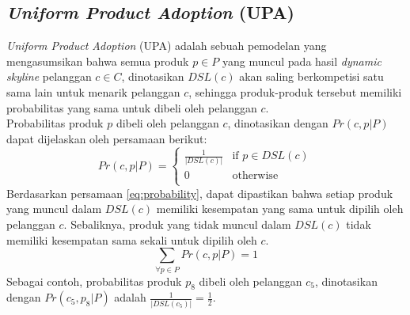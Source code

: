 \subsection{\textit{Uniform Product Adoption} (UPA)}
\tab \textit{Uniform Product Adoption} (UPA) adalah sebuah pemodelan yang mengasumsikan bahwa semua produk $p \in P$ yang muncul pada hasil \textit{dynamic skyline} pelanggan $c \in C$, dinotasikan $DSL(c)$ akan saling berkompetisi satu sama lain untuk menarik pelanggan $c$, sehingga produk-produk tersebut memiliki probabilitas yang sama untuk dibeli oleh pelanggan $c$.\\
\tab Probabilitas produk $p$ dibeli oleh pelanggan $c$, dinotasikan dengan $Pr(c, p|P)$ dapat dijelaskan oleh persamaan berikut:
\begin{equation}\label{eq:probability}
Pr(c, p|P) = \left\{
				\begin{array}{ll}
					\frac{1}{|DSL(c)|} & \text{if } p \in DSL(c)\\
					0 & \text{otherwise}\\
				\end{array}
				\right.
\end{equation}
\tab Berdasarkan persamaan \ref{eq:probability}, dapat dipastikan bahwa setiap produk yang muncul dalam $DSL(c)$ memiliki kesempatan yang sama untuk dipilih oleh pelanggan $c$. Sebaliknya, produk yang tidak muncul dalam $DSL(c)$ tidak memiliki kesempatan sama sekali untuk dipilih oleh $c$.\\
\begin{equation}\label{eq:probability1}
\sum_{\forall p \in P} Pr(c, p|P) = 1
\end{equation}
\tab Sebagai contoh, probabilitas produk $p_8$ dibeli oleh pelanggan $c_5$, dinotasikan dengan $Pr(c_5, p_8|P)$ adalah $\frac{1}{|DSL(c_5)|} = \frac{1}{2}$.

